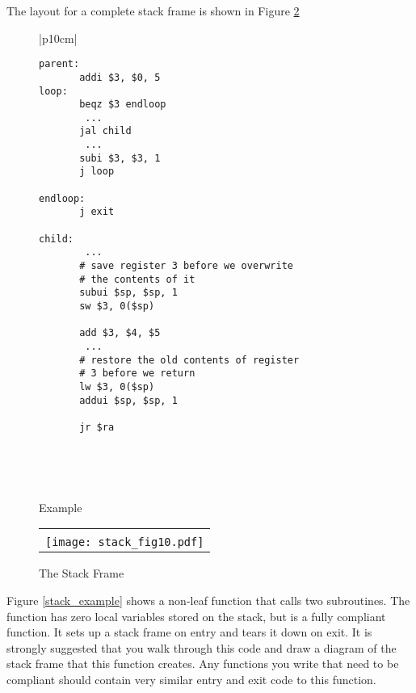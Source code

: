 The layout for a complete stack frame is shown in Figure \ref{stackframe}

%
%
\begin{figure}[!btp]

\begin{center}
\begin{tabular}{|p{10cm}|}
\hline
\begin{scriptsize}
\begin{verbatim}
parent:
       addi $3, $0, 5
loop:
       beqz $3 endloop
        ...
       jal child
        ...
       subi $3, $3, 1
       j loop

endloop:
       j exit

child:
        ...
       # save register 3 before we overwrite
       # the contents of it
       subui $sp, $sp, 1
       sw $3, 0($sp)

       add $3, $4, $5
        ...
       # restore the old contents of register
       # 3 before we return
       lw $3, 0($sp)
       addui $sp, $sp, 1

       jr $ra
\end{verbatim}
\end{scriptsize}
\\
\hline
\end{tabular}
\end{center}
\

\caption{Example}
\label{fig:paramexample}
\end{figure}


\begin{figure}[!hbtp]
\begin{footnotesize}
\begin{center}
\begin{tabular}{|p{8cm}|}
\hline
\\
\texttt{[image: stack\_fig10.pdf]}

\\
\hline
\end{tabular}
\end{center}
\end{footnotesize}

\caption{The Stack Frame}
\label{stackframe}
\end{figure}

Figure \ref{stack_example} shows a non-leaf function that calls two
subroutines. The function has zero local variables stored on the
stack, but is a fully compliant function. It sets up a stack frame on
entry and tears it down on exit. It is strongly suggested that you
walk through this code and draw a diagram of the stack frame that this
function creates. Any functions you write that need to be compliant
should contain very similar entry and exit code to this function.

